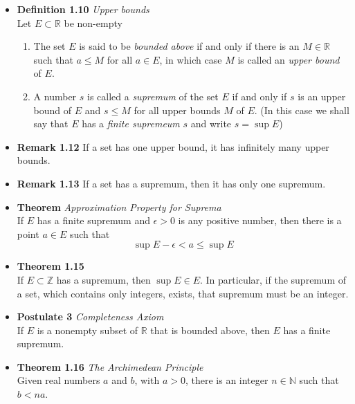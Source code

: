 \documentclass[11pt,a4paper]{article}
\begin{document}
\begin{itemize}
    \item \textbf{Definition 1.10} \emph{Upper bounds} \\
        Let $E \subset \mathbb{R}$ be non-empty
        \begin{enumerate}
            \item The set $E$ is said to be \emph{bounded above} if and only if there is an
                $M \in \mathbb{R}$ such that $a \leq M$ for all $a \in E$,
                in which case $M$ is called an \emph{upper bound} of $E$.
            \item A number $s$ is called a \emph{supremum} of the set $E$ if and only if $s$
                is an upper bound of $E$ and $s \leq M$ for all upper bounds $M$ of $E$.
                (In this case we shall say that $E$ has a \emph{finite supremeum} $s$ and write
                $s = \sup E$)
        \end{enumerate}

    \item \textbf{Remark 1.12}
        If a set has one upper bound, it has infinitely many upper bounds.

    \item \textbf{Remark 1.13}
        If a set has a supremum, then it has only one supremum.

    \item \textbf{Theorem} \emph{Approximation Property for Suprema} \\
        If $E$ has a finite supremum and $\epsilon > 0$ is any positive number, then there is a
        point $a \in E$ such that
        \[
            \sup E - \epsilon < a \leq \sup E
        \]

    \item \textbf{Theorem 1.15} \\
        If $E \subset \mathbb{Z}$ has a supremum, then $\sup E \in E$.
        In particular, if the supremum of a set, which contains only integers, exists,
        that supremum must be an integer.

    \item \textbf{Postulate 3} \emph{Completeness Axiom} \\
        If $E$ is a nonempty subset of $\mathbb{R}$ that is bounded above, then $E$ has a
        finite
        supremum.

    \item \textbf{Theorem 1.16} \emph{The Archimedean Principle} \\
        Given real numbers $a$ and $b$, with $a > 0$, there is an integer $n \in \mathbb{N}$
        such that $b < na$.


\end{itemize}
\end{document}
